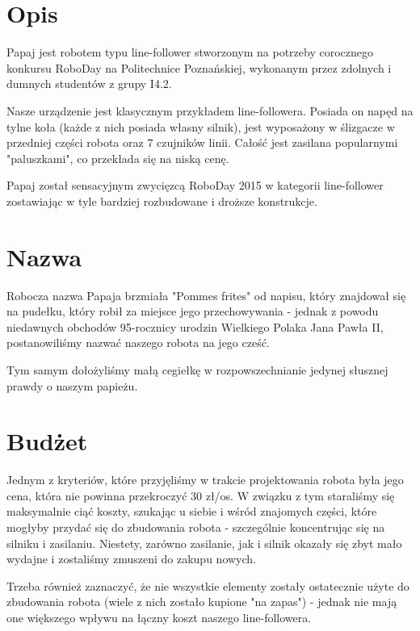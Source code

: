 \documentclass{article}
\begin{document}

\tableofcontents
\newpage

\section{Opis}

Papaj jest robotem typu line-follower stworzonym na potrzeby corocznego konkursu RoboDay na Politechnice Poznańskiej, wykonanym przez zdolnych i dumnych studentów z grupy I4.2. 

Nasze urządzenie jest klasycznym przykładem line-followera. Posiada on napęd na tylne koła (każde z nich posiada własny silnik), jest wyposażony w ślizgacze w przedniej części robota oraz 7 czujników linii. Całość jest zasilana popularnymi "paluszkami", co przekłada się na niską cenę.

Papaj został sensacyjnym zwycięzcą RoboDay 2015 w kategorii line-follower zostawiając w tyle bardziej rozbudowane i droższe konstrukcje.

\section{Nazwa}
				
Robocza nazwa Papaja brzmiała "Pommes frites" od napisu, który znajdował się na pudełku, który robił za miejsce jego przechowywania - jednak z powodu niedawnych obchodów 95-rocznicy urodzin Wielkiego Polaka Jana Pawła II, postanowiliśmy nazwać naszego robota na jego cześć. 

Tym samym dołożyliśmy małą cegiełkę w rozpowszechnianie jedynej słusznej prawdy o naszym papieżu. 
						
\section{Budżet}

Jednym z kryteriów, które przyjęliśmy w trakcie projektowania robota była jego cena, która nie powinna przekroczyć 30 zł/os. W związku z tym staraliśmy się maksymalnie ciąć koszty, szukając u siebie i wśród znajomych części, które mogłyby przydać się do zbudowania robota - szczególnie koncentrując się na silniku i zasilaniu. Niestety, zarówno zasilanie, jak i silnik okazały się zbyt mało wydajne i zostaliśmy zmuszeni do zakupu nowych.

Trzeba również zaznaczyć, że nie wszystkie elementy zostały ostatecznie użyte do zbudowania robota (wiele z nich zostało kupione "na zapas") - jednak nie mają one większego wpływu na łączny koszt naszego line-followera.
\end{document}
